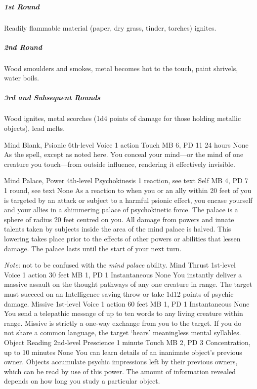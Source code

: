 \subparagraph{1st Round}
  Readily flammable material
  (paper, dry grass, tinder, torches) ignites.

\subparagraph{2nd Round}
  Wood smoulders and smokes,
  metal becomes hot to the touch,
  paint shrivels, water boils.

\subparagraph{3rd and Subsequent Rounds}
  Wood ignites, metal scorches
  (1d4 points of damage for those holding metallic objects),
  lead melts.

\DndPowerHeader%
    {Mind Blank, Psionic\label{pwr:mind_blank_psionic}}
    {6th-level Voice}
    {1 action}
    {Touch}
    {MB 6, PD 11}
    {24 hours}
    {None}
As the  spell, except as
noted here. You conceal your mind---or the mind of one creature
you touch---from outside influence, rendering it effectively
invisible.

\DndPowerHeader%
    {Mind Palace, Power\label{pwr:mind_palace_power}}
    {4th-level Psychokinesis}
    {1 reaction, see text}
    {Self}
    {MB 4, PD 7}
    {1 round, see text}
    {None}
As a reaction to when you or an ally within
20 feet of you is targeted by an attack or subject to a harmful
psionic effect, you encase yourself and your allies in a shimmering
palace of psychokinetic force. The palace is a sphere of radius
20 feet centred on you. All damage from powers and innate
talents taken by subjects inside the area of the mind palace
is halved. This lowering takes place prior to the effects
of other powers or abilities that lessen damage. The palace
lasts until the start of your next turn.

\emph{Note:} not to be confused with the \emph{mind palace} ability.
\DndPowerHeader%
    {Mind Thrust\label{pwr:mind_thrust}}
    {1st-level Voice}
    {1 action}
    {30 feet}
    {MB 1, PD 1}
    {Instantaneous}
    {None}
You instantly deliver a massive assault on
the thought pathways of any one creature in range. The target
must succeed on an Intelligence saving throw or take 1d12
points of psychic damage.
\DndPowerHeader%
    {Missive\label{pwr:missive}}
    {1st-level Voice}
    {1 action}
    {60 feet}
    {MB 1, PD 1}
    {Instantaneous}
    {None}
You send a telepathic message of up to ten
words to any living creature within range. Missive is strictly
a one-way exchange from you to the target. If you do not share
a common language, the target `hears' meaningless mental
syllables.
\DndPowerHeader%
    {Object Reading\label{pwr:object_reading}}
    {2nd-level Prescience}
    {1 minute}
    {Touch}
    {MB 2, PD 3}
    {Concentration, up to 10 minutes}
    {None}
You can learn details of an inanimate object's
previous owner.
Objects accumulate psychic impressions
left by their previous owners,
which can be read by use of this power.
The amount of information revealed depends
on how long you study a particular object.

